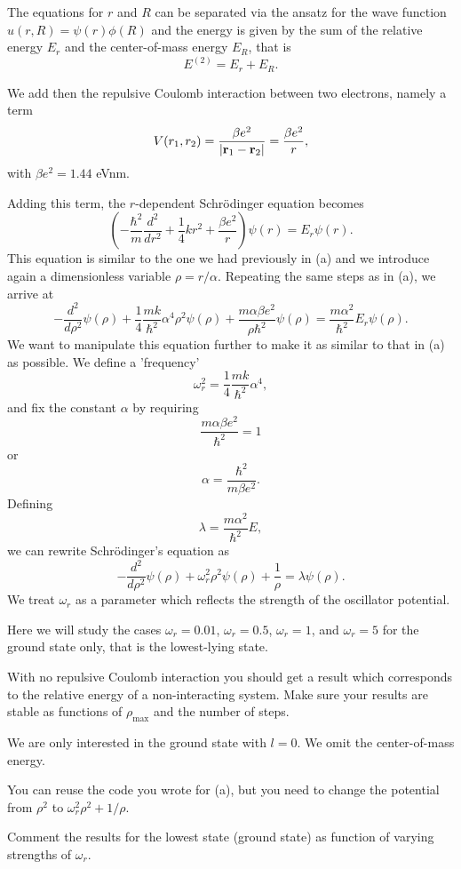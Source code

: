 \documentclass[11pt,a4wide]{article}
\begin{document}
\begin{enumerate}
The equations for $r$ and $R$ can be separated via the ansatz for the 
wave function $u(r,R) = \psi(r)\phi(R)$ and the energy is given by the sum
of the relative energy $E_r$ and the center-of-mass energy $E_R$, that
is
\[
E^{(2)}=E_r+E_R.
\]

We add then the repulsive Coulomb interaction between two electrons,
namely a term 
\[
V(r_1,r_2) = \frac{\beta e^2}{|{\bf r}_1-{\bf r}_2|}=\frac{\beta e^2}{r},
\]
with $\beta e^2=1.44$ eVnm.

Adding this term, the $r$-dependent Schr\"odinger equation becomes
\[
\left(  -\frac{\hbar^2}{m} \frac{d^2}{dr^2}+ \frac{1}{4}k r^2+\frac{\beta e^2}{r}\right)\psi(r)  = E_r \psi(r).
\]
This equation is similar to the one we had previously in (a) and we introduce
again a dimensionless variable $\rho = r/\alpha$. Repeating the same
steps as in (a), we arrive at 
\[
  -\frac{d^2}{d\rho^2} \psi(\rho) 
       + \frac{1}{4}\frac{mk}{\hbar^2} \alpha^4\rho^2\psi(\rho)+\frac{m\alpha \beta e^2}{\rho\hbar^2}\psi(\rho)  = 
\frac{m\alpha^2}{\hbar^2}E_r \psi(\rho) .
\]
We want to manipulate this equation further to make it as similar to that in (a)
as possible. We define a 'frequency' 
\[
\omega_r^2=\frac{1}{4}\frac{mk}{\hbar^2} \alpha^4,
\]
and fix the constant $\alpha$ by requiring 
\[
\frac{m\alpha \beta e^2}{\hbar^2}=1
\]
or 
\[
\alpha = \frac{\hbar^2}{m\beta e^2}.
\]
Defining 
\[
\lambda = \frac{m\alpha^2}{\hbar^2}E,
\]
we can rewrite Schr\"odinger's equation as
\[
  -\frac{d^2}{d\rho^2} \psi(\rho) + \omega_r^2\rho^2\psi(\rho) +\frac{1}{\rho} = \lambda \psi(\rho).
\]
We treat $\omega_r$ as a parameter which reflects the strength of the oscillator potential.

Here we will study the cases $\omega_r = 0.01$, $\omega_r = 0.5$, $\omega_r =1$,
and $\omega_r = 5$   
for the ground state only, that is the lowest-lying state.


With no repulsive Coulomb interaction 
you should get a result which corresponds to 
the relative energy of a non-interacting system.   
Make sure your results are 
stable as functions of $\rho_{\mathrm{max}}$ and the number of steps.

We are only interested in the ground state with $l=0$. We omit the 
center-of-mass energy.

You can reuse the code you wrote for (a), 
but you need to change the potential
from $\rho^2$ to $\omega_r^2\rho^2+1/\rho$. 

Comment the results for the lowest state (ground state) as function of
varying strengths of $\omega_r$. 



\end{enumerate}
\end{document}
